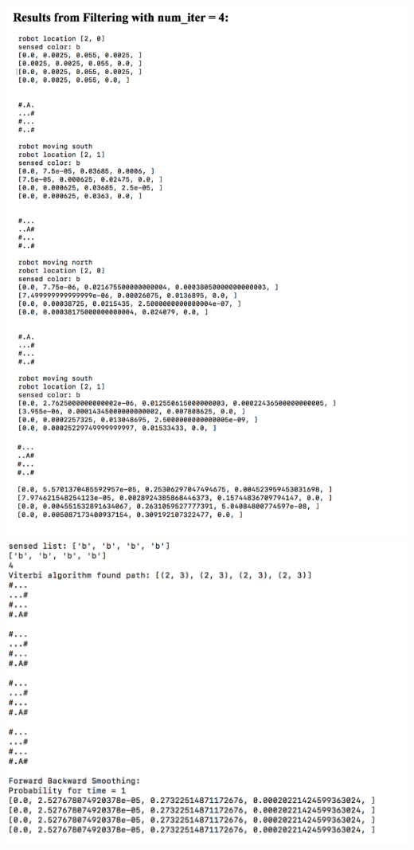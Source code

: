\documentclass{article}
\begin{document}
\includegraphics[width=\textwidth]{test_maze2_iter4.pdf}
\includegraphics[width=\textwidth]{test_smoothing.pdf}
\end{document}
